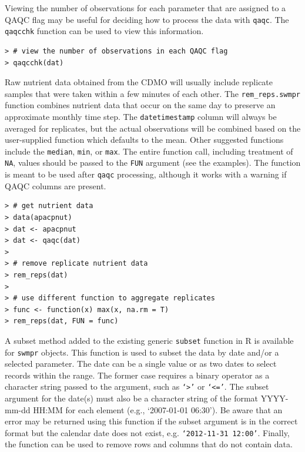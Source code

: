 \documentclass[10pt,letterpaper]{article}\usepackage[]{graphicx}\usepackage[]{color}
\makeatletter
\newenvironment{kframe}{%
 \def\at@end@of@kframe{}%
 \ifinner\ifhmode%
  \def\at@end@of@kframe{\end{minipage}}%
  \begin{minipage}{\columnwidth}%
 \fi\fi%
 \def\FrameCommand##1{\hskip\@totalleftmargin \hskip-\fboxsep
 \colorbox{shadecolor}{##1}\hskip-\fboxsep
     \hskip-\linewidth \hskip-\@totalleftmargin \hskip\columnwidth}%
 \MakeFramed {\advance\hsize-\width
   \@totalleftmargin\z@ \linewidth\hsize
   \@setminipage}}%
 {\par\unskip\endMakeFramed%
 \at@end@of@kframe}
\newenvironment{knitrout}{}{} %
\makeatother
\begin{document}
Viewing the number of observations for each parameter that are assigned to a \ac{QAQC} flag may be useful for deciding how to process the data with \texttt{qaqc}.  The \texttt{qaqcchk} function can be used to view this information.

\begin{knitrout}
\color{fgcolor}\begin{kframe}
\begin{verbatim}
> # view the number of observations in each QAQC flag
> qaqcchk(dat)
\end{verbatim}
\end{kframe}
\end{knitrout}

Raw nutrient data obtained from the \ac{CDMO} will usually include replicate samples that were taken within a few minutes of each other.  The \texttt{rem\_reps.swmpr} function combines nutrient data that occur on the same day to preserve an approximate monthly time step.  The \texttt{datetimestamp} column will always be averaged for replicates, but the actual observations will be combined based on the user-supplied function which defaults to the mean.  Other suggested functions include the \texttt{median}, \texttt{min}, or \texttt{max}.  The entire function call, including treatment of \texttt{NA}, values should be passed to the \texttt{FUN} argument (see the examples).  The function is meant to be used after \texttt{qaqc} processing, although it works with a warning if \ac{QAQC} columns are present.

\begin{knitrout}
\color{fgcolor}\begin{kframe}
\begin{verbatim}
> # get nutrient data
> data(apacpnut)
> dat <- apacpnut
> dat <- qaqc(dat)
> 
> # remove replicate nutrient data
> rem_reps(dat)
> 
> # use different function to aggregate replicates
> func <- function(x) max(x, na.rm = T)
> rem_reps(dat, FUN = func)
\end{verbatim}
\end{kframe}
\end{knitrout}

A subset method added to the existing generic \texttt{subset} function in R is available for \texttt{swmpr} objects.  This function is used to subset the data by date and/or a selected parameter.  The date can be a single value or as two dates to select records within the range. The former case requires a binary operator as a character string passed to the argument, such as \texttt{`>'} or \texttt{`<='}.  The subset argument for the date(s) must also be a character string of the format YYYY-mm-dd HH:MM for each element (e.g., `2007-01-01 06:30').  Be aware that an error may be returned using this function if the subset argument is in the correct format but the calendar date does not exist, e.g. \texttt{`2012-11-31 12:00'}.  Finally, the function can be used to remove rows and columns that do not contain data. 
\end{document}

